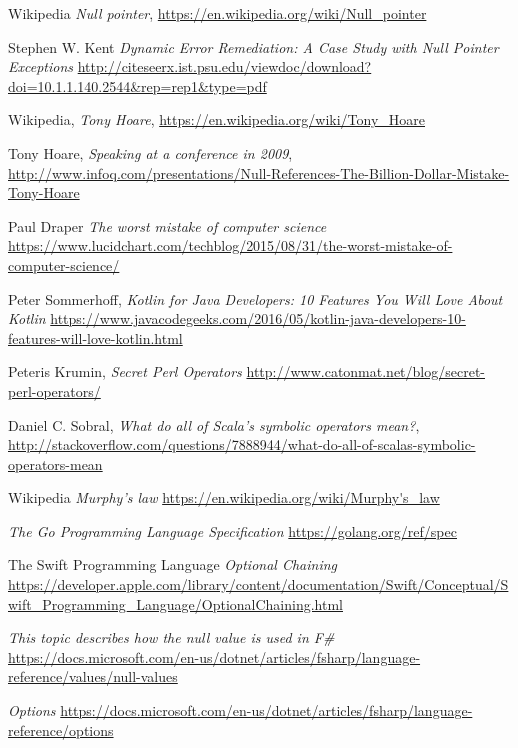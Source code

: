 \documentclass[12pt,a4paper]{report}
\begin{document}
\begin{thebibliography}{100}
	
    Wikipedia
    \textit{Null pointer},
    \url{https://en.wikipedia.org/wiki/Null_pointer}

    Stephen W. Kent
    \textit{Dynamic Error Remediation: A Case Study with Null Pointer Exceptions}
    \url{http://citeseerx.ist.psu.edu/viewdoc/download?doi=10.1.1.140.2544&rep=rep1&type=pdf}

	Wikipedia,
	\textit{Tony Hoare},
	\url{https://en.wikipedia.org/wiki/Tony_Hoare}
	
	Tony Hoare,
	\textit{Speaking at a conference in 2009},
	\url{http://www.infoq.com/presentations/Null-References-The-Billion-Dollar-Mistake-Tony-Hoare}

    Paul Draper
    \textit{The worst mistake of computer science}
    \url{https://www.lucidchart.com/techblog/2015/08/31/the-worst-mistake-of-computer-science/}

 	Peter Sommerhoff,
 	\textit{Kotlin for Java Developers: 10 Features You Will Love About Kotlin}
 	\url{https://www.javacodegeeks.com/2016/05/kotlin-java-developers-10-features-will-love-kotlin.html}

	Peteris Krumin,
	\textit{Secret Perl Operators}
	\url{http://www.catonmat.net/blog/secret-perl-operators/}

	Daniel C. Sobral,
	\textit{What do all of Scala's symbolic operators mean?},
	\url{http://stackoverflow.com/questions/7888944/what-do-all-of-scalas-symbolic-operators-mean}
	
    Wikipedia
    \textit{Murphy's law}
    \url{https://en.wikipedia.org/wiki/Murphy's_law}

    \textit{The Go Programming Language Specification}
    \url{https://golang.org/ref/spec}
    
    
    The Swift Programming Language
    \textit{Optional Chaining}
    \url{https://developer.apple.com/library/content/documentation/Swift/Conceptual/Swift_Programming_Language/OptionalChaining.html}
    
    \textit{This topic describes how the null value is used in F\#}
    \url{https://docs.microsoft.com/en-us/dotnet/articles/fsharp/language-reference/values/null-values}
    
    \textit{Options}
    \url{https://docs.microsoft.com/en-us/dotnet/articles/fsharp/language-reference/options}
    
\end{thebibliography}
\end{document}
